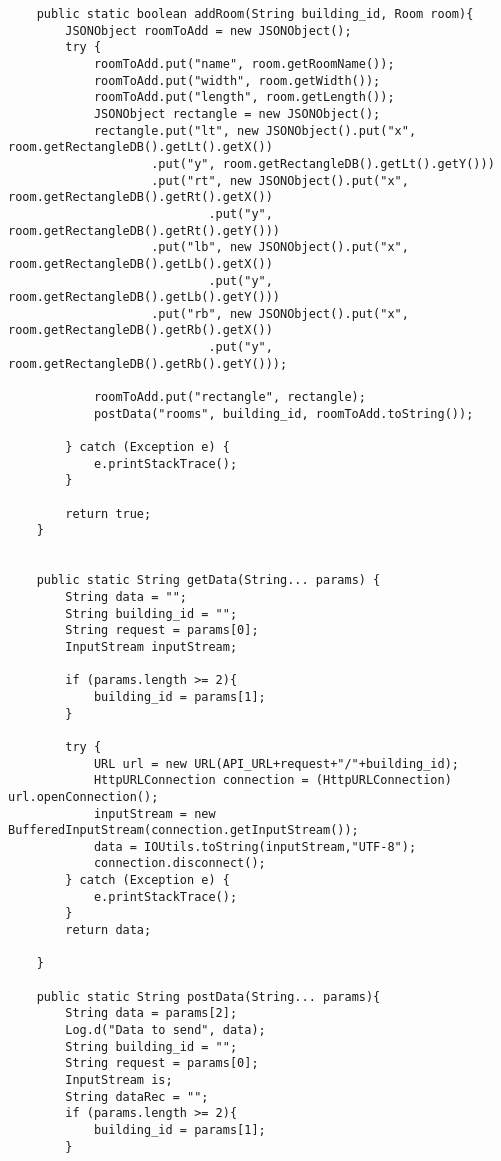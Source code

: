 \begin{lstlisting}
    public static boolean addRoom(String building_id, Room room){
        JSONObject roomToAdd = new JSONObject();
        try {
            roomToAdd.put("name", room.getRoomName());
            roomToAdd.put("width", room.getWidth());
            roomToAdd.put("length", room.getLength());
            JSONObject rectangle = new JSONObject();
            rectangle.put("lt", new JSONObject().put("x", room.getRectangleDB().getLt().getX())
                    .put("y", room.getRectangleDB().getLt().getY()))
                    .put("rt", new JSONObject().put("x", room.getRectangleDB().getRt().getX())
                            .put("y", room.getRectangleDB().getRt().getY()))
                    .put("lb", new JSONObject().put("x", room.getRectangleDB().getLb().getX())
                            .put("y", room.getRectangleDB().getLb().getY()))
                    .put("rb", new JSONObject().put("x", room.getRectangleDB().getRb().getX())
                            .put("y", room.getRectangleDB().getRb().getY()));

            roomToAdd.put("rectangle", rectangle);
            postData("rooms", building_id, roomToAdd.toString());

        } catch (Exception e) {
            e.printStackTrace();
        }

        return true;
    }


    public static String getData(String... params) {
        String data = "";
        String building_id = "";
        String request = params[0];
        InputStream inputStream;

        if (params.length >= 2){
            building_id = params[1];
        }

        try {
            URL url = new URL(API_URL+request+"/"+building_id);
            HttpURLConnection connection = (HttpURLConnection) url.openConnection();
            inputStream = new BufferedInputStream(connection.getInputStream());
            data = IOUtils.toString(inputStream,"UTF-8");
            connection.disconnect();
        } catch (Exception e) {
            e.printStackTrace();
        }
        return data;

    }

    public static String postData(String... params){
        String data = params[2];
        Log.d("Data to send", data);
        String building_id = "";
        String request = params[0];
        InputStream is;
        String dataRec = "";
        if (params.length >= 2){
            building_id = params[1];
        }


\end{lstlisting}

